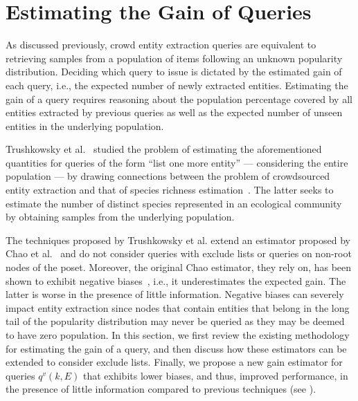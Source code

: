 
\section{Estimating the Gain of Queries}
\label{sec:gainestimators}
As discussed previously, crowd entity extraction queries are equivalent to retrieving samples from a population of items following an unknown popularity distribution. Deciding which query to issue is dictated by the estimated gain of each query, i.e., the expected number of newly extracted entities. Estimating the gain of a query requires reasoning about the population percentage covered by all entities extracted by previous queries as well as the expected number of unseen entities in the underlying population.

Trushkowsky et al.~\cite{trushkowsky:2013} studied the problem of estimating the aforementioned quantities for queries of the form ``list one more entity'' --- considering the entire population --- by drawing connections between the problem of crowdsourced entity extraction and that of species richness estimation~\cite{chao:1992}. The latter seeks to estimate the number of distinct species represented in an ecological community by obtaining samples from the underlying population. 

The techniques proposed by Trushkowsky et al. extend an estimator proposed by Chao et al.~\cite{chao:1992} and do not consider queries with exclude lists or queries on non-root nodes of the poset. Moreover, the original Chao estimator, they rely on, has been shown to exhibit negative biases~\cite{hwang:2010, shen:2003}, i.e., it underestimates the expected gain. The latter is worse in the presence of little information. Negative biases can severely impact entity extraction since nodes that contain entities that belong in the long tail of the popularity distribution may never be queried as they may be deemed to have zero population. In this section, we first review the existing methodology for estimating the gain of a query, and then discuss how these estimators can be extended to consider exclude lists. Finally, we propose a new gain estimator for queries $q^v(k,E)$ that exhibits lower biases, and thus, improved performance, in the presence of little information compared to previous techniques (see ).

